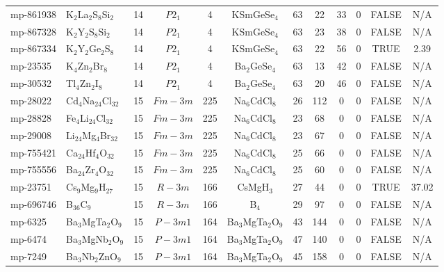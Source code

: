 {\begin{longtable}{llcccccccccc}
    mp-861938 & K$_{2}$La$_{2}$S$_{8}$Si$_{2}$ & 14    & $P2_1$ & 4     & KSmGeSe$_{4}$ & 63    & 22    & 33    & 0     & FALSE & N/A \\
    mp-867328 & K$_{2}$Y$_{2}$S$_{8}$Si$_{2}$ & 14    & $P2_1$ & 4     & KSmGeSe$_{4}$ & 63    & 23    & 38    & 0     & FALSE & N/A \\
    mp-867334 & K$_{2}$Y$_{2}$Ge$_{2}$S$_{8}$ & 14    & $P2_1$ & 4     & KSmGeSe$_{4}$ & 63    & 22    & 56    & 0     & TRUE  & 2.39  \\
    mp-23535 & K$_{4}$Zn$_{2}$Br$_{8}$ & 14    & $P2_1$ & 4     & Ba$_{2}$GeSe$_{4}$ & 63    & 13    & 42    & 0     & FALSE & N/A \\
    mp-30532 & Tl$_{4}$Zn$_{2}$I$_{8}$ & 14    & $P2_1$ & 4     & Ba$_{2}$GeSe$_{4}$ & 63    & 20    & 46    & 0     & FALSE & N/A \\
    mp-28022 & Cd$_{4}$Na$_{24}$Cl$_{32}$ & 15    & $Fm-3m$ & 225   & Na$_{6}$CdCl$_{8}$ & 26    & 112   & 0     & 0     & FALSE & N/A \\
    mp-28828 & Fe$_{4}$Li$_{24}$Cl$_{32}$ & 15    & $Fm-3m$ & 225   & Na$_{6}$CdCl$_{8}$ & 23    & 68    & 0     & 0     & FALSE & N/A \\
    mp-29008 & Li$_{24}$Mg$_{4}$Br$_{32}$ & 15    & $Fm-3m$ & 225   & Na$_{6}$CdCl$_{8}$ & 23    & 67    & 0     & 0     & FALSE & N/A \\
    mp-755421 & Ca$_{24}$Hf$_{4}$O$_{32}$ & 15    & $Fm-3m$ & 225   & Na$_{6}$CdCl$_{8}$ & 25    & 66    & 0     & 0     & FALSE & N/A \\
    mp-755556 & Ba$_{24}$Zr$_{4}$O$_{32}$ & 15    & $Fm-3m$ & 225   & Na$_{6}$CdCl$_{8}$ & 25    & 60    & 0     & 0     & FALSE & N/A \\
    mp-23751 & Cs$_{9}$Mg$_{9}$H$_{27}$ & 15    & $R-3m$ & 166   & CsMgH$_{3}$ & 27    & 44    & 0     & 0     & TRUE  & 37.02  \\
    mp-696746 & B$_{36}$C$_{9}$ & 15    & $R-3m$ & 166   & B$_{4}$ & 29    & 97    & 0     & 0     & FALSE & N/A \\
    mp-6325 & Ba$_{3}$MgTa$_{2}$O$_{9}$ & 15    & $P-3m1$ & 164   & Ba$_{3}$MgTa$_{2}$O$_{9}$ & 43    & 144   & 0     & 0     & FALSE & N/A \\
    mp-6474 & Ba$_{3}$MgNb$_{2}$O$_{9}$ & 15    & $P-3m1$ & 164   & Ba$_{3}$MgTa$_{2}$O$_{9}$ & 47    & 140   & 0     & 0     & FALSE & N/A \\
    mp-7249 & Ba$_{3}$Nb$_{2}$ZnO$_{9}$ & 15    & $P-3m1$ & 164   & Ba$_{3}$MgTa$_{2}$O$_{9}$ & 45    & 158   & 0     & 0     & FALSE & N/A \\

\end{longtable}}
